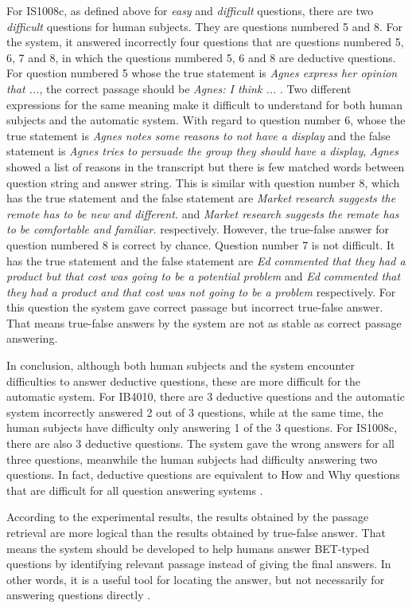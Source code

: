 For IS1008c, as defined above for \textit{easy} and \textit{difficult} questions, there are two \textit{difficult} questions for human subjects. They are questions numbered 5 and 8. For the system, it answered incorrectly four questions that are questions numbered 5, 6, 7 and 8, in which the questions numbered 5, 6 and 8 are deductive questions. For question numbered 5 whose the true statement is \textit{Agnes express her opinion that ...}, the correct passage should be \textit{Agnes: I think ... }. Two different expressions for the same meaning make it difficult to understand for both human subjects and the automatic system. With regard to question number 6, whose the true statement is \textit{Agnes notes some reasons to not have a display} and the false statement is \textit{Agnes tries to persuade the group they should have a display}, \textit{Agnes} showed a list of reasons in the transcript but there is few matched words between question string and answer string. This is similar with question number 8, which has the true statement and the false statement are \textit{Market research suggests the remote has to be new and different.} and \textit{Market research suggests the remote has to be comfortable and familiar.} respectively. However, the true-false answer for question numbered 8 is correct by chance. Question number 7 is not difficult. It has the true statement and the false statement are \textit{Ed commented that they had a product but that cost was going to be a potential problem} and \textit{Ed commented that they had a product and that cost was not going to be a problem} respectively. For this question the system gave correct passage but incorrect true-false answer. That means true-false answers by the system are not as stable as correct passage answering.

In conclusion, although both human subjects and the system encounter difficulties to answer deductive questions, these are more difficult for the automatic system. For IB4010, there are 3 deductive questions and the automatic system incorrectly answered 2 out of 3 questions, while at the same time, the human subjects have difficulty only answering 1 of the 3 questions. For IS1008c, there are also 3 deductive questions. The system gave the wrong answers for all three questions, meanwhile the human subjects had difficulty answering two questions. In fact, deductive questions are equivalent to How and Why questions that are difficult for all question answering systems \cite{prager2000qap, brill2002diq}.

According to the experimental results, the results obtained by the passage retrieval are more logical than the results obtained by true-false answer. That means the system should be developed to help humans answer BET-typed questions by identifying relevant passage instead of giving the final answers. In other words, it is a useful tool for locating the answer, but not necessarily for answering questions directly \cite{lequocanh1}.
 

\newpage




